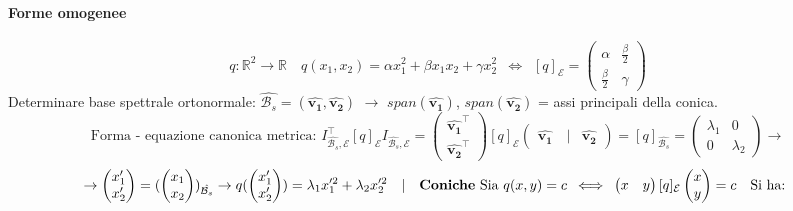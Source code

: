 \documentclass[10pt]{article}
\theoremstyle{plain}
\begin{document}
\paragraph{Forme omogenee}
\[q: \mathbb{R}^2 \rightarrow \mathbb{R} \quad q(x_1, x_2) = \alpha x_1^2 + \beta x_1 x_2 + \gamma x_2^2 \enspace \Longleftrightarrow \enspace [q]_{\mathcal{E}} = \begin{pmatrix}
    \alpha & \frac{\beta}{2}\\
    \frac{\beta}{2} & \gamma
\end{pmatrix}\]
Determinare base spettrale ortonormale: $\hat{\mathcal{B}_s} = (\hat{\mathbf{v_1}}, \hat{\mathbf{v_2}})$ $\rightarrow$ $span(\hat{\mathbf{v_1}})$, $span(\hat{\mathbf{v_2}})$ = assi principali della conica.
\[\textrm{Forma - equazione canonica metrica: } I_{\hat{\mathcal{B}_s}, \mathcal{E}}^{\top} [q]_{\mathcal{E}} I_{\hat{\mathcal{B}_s}, \mathcal{E}} = \begin{pmatrix}
    \hat{\mathbf{v_1}}^{\top} \\ \hat{\mathbf{v_2}}^{\top}
\end{pmatrix} [q]_{\mathcal{E}} \begin{pmatrix}
    \hat{\mathbf{v_1}} \quad |& \hat{\mathbf{v_2}}
\end{pmatrix} = [q]_{\hat{\mathcal{B}_s}} = \begin{pmatrix} \lambda_1 & 0\\ 0 & \lambda_2 \end{pmatrix} \rightarrow\] \[\rightarrow \begin{pmatrix} x_1'\\ x_2'\end{pmatrix} = (\begin{pmatrix}x_1\\ x_2\end{pmatrix})_{\hat{\mathcal{B}_s}} \rightarrow q(\begin{pmatrix} x_1'\\x_2' \end{pmatrix}) = \lambda_1 x_1'^2 + \lambda_2 x_2'^2 \quad | \quad \textrm{\textbf{Coniche} Sia } q(x,y) = c \enspace \Longleftrightarrow \enspace \begin{pmatrix}
x & y
\end{pmatrix} [q]_{\mathcal{E}} \begin{pmatrix}
    x\\ y
\end{pmatrix} = c \quad \textrm{Si ha: }\]
\end{document}
